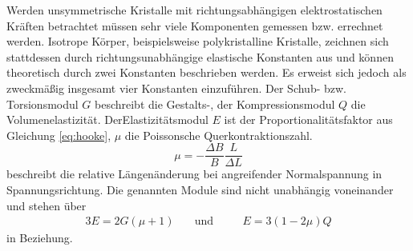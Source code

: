 Werden unsymmetrische Kristalle mit richtungsabhängigen elektrostatischen Kräften betrachtet müssen sehr viele Komponenten gemessen bzw. errechnet werden. 
Isotrope Körper, beispielsweise polykristalline Kristalle, zeichnen sich stattdessen durch richtungsunabhängige elastische Konstanten aus und können theoretisch durch zwei Konstanten beschrieben werden. 
Es erweist sich jedoch als zweckmäßig insgesamt vier Konstanten einzuführen.
Der Schub- bzw. Torsionsmodul $G$ beschreibt die Gestalts-, der Kompressionsmodul $Q$ die Volumenelastizität.
DerElastizitätsmodul $E$ ist der Proportionalitätsfaktor aus Gleichung \eqref{eq:hooke}, $\mu$ die Poissonsche Querkontraktionszahl. 
\begin{equation}
\mu=-\frac{\Delta{B}}{B}\frac{L}{\Delta{L}}
\label{eq:mu}
\end{equation}
beschreibt die relative Längenänderung bei angreifender Normalspannung in Spannungsrichtung.
Die genannten Module sind nicht unabhängig voneinander und stehen über
\begin{alignat}{3}
	 E=2G(\mu+1) &\quad\text{und} &&\quad E=3(1-2\mu)Q
\label{eq:modulbeziehungen}
\end{alignat}
in Beziehung.

